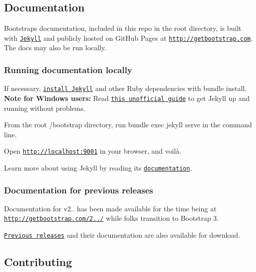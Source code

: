 \subsection*{Documentation}

Bootstrap\textquotesingle{}s documentation, included in this repo in the root directory, is built with \href{http://jekyllrb.com}{\tt Jekyll} and publicly hosted on Git\+Hub Pages at \href{http://getbootstrap.com}{\tt http\+://getbootstrap.\+com}. The docs may also be run locally.

\subsubsection*{Running documentation locally}


\begin{DoxyEnumerate}
\item If necessary, \href{http://jekyllrb.com/docs/installation}{\tt install Jekyll} and other Ruby dependencies with {\ttfamily bundle install}. {\bfseries Note for Windows users\+:} Read \href{http://jekyll-windows.juthilo.com/}{\tt this unofficial guide} to get Jekyll up and running without problems.
\item From the root {\ttfamily /bootstrap} directory, run {\ttfamily bundle exec jekyll serve} in the command line.
\item Open {\ttfamily \href{http://localhost:9001}{\tt http\+://localhost\+:9001}} in your browser, and voilà.
\end{DoxyEnumerate}

Learn more about using Jekyll by reading its \href{http://jekyllrb.com/docs/home/}{\tt documentation}.

\subsubsection*{Documentation for previous releases}

Documentation for v2.. has been made available for the time being at \href{http://getbootstrap.com/2.3.2/}{\tt http\+://getbootstrap.\+com/2../} while folks transition to Bootstrap 3.

\href{https://github.com/twbs/bootstrap/releases}{\tt Previous releases} and their documentation are also available for download.

\subsection*{Contributing}

